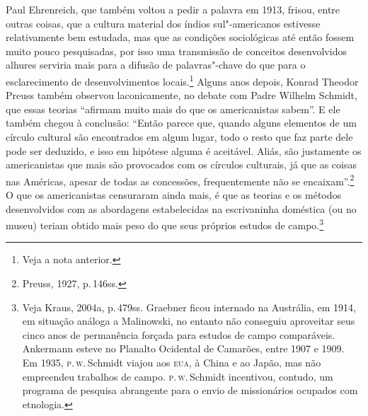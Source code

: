 Paul Ehrenreich, que também voltou a pedir a palavra em 1913, frisou,
entre outras coisas, que a cultura material dos índios sul"-americanos
estivesse relativamente bem estudada, mas que as condições sociológicas
até então fossem muito pouco pesquisadas, por isso uma transmissão de
conceitos desenvolvidos alhures serviria mais para a difusão de
palavras"-chave do que para o esclarecimento de desenvolvimentos
locais.\footnote{Veja a nota anterior.} Alguns anos depois, Konrad
Theodor Preuss também observou laconicamente, no debate com Padre
Wilhelm Schmidt, que essas teorias ``afirmam muito mais do que os
americanistas sabem''. E ele também chegou à conclusão: ``Então parece
que, quando alguns elementos de um círculo cultural são encontrados em
algum lugar, todo o resto que faz parte dele pode ser deduzido, e isso
em hipótese alguma é aceitável. Aliás, são justamente os americanistas
que mais são provocados com os círculos culturais, já que as coisas nas
Américas, apesar de todas as concessões, frequentemente não se
encaixam''.\footnote{Preuss, 1927, p.\,146ss.} O que os americanistas censuraram
ainda mais, é que as teorias e os métodos desenvolvidos com as
abordagens estabelecidas na escrivaninha doméstica (ou no museu) teriam
obtido mais peso do que seus próprios estudos de campo.\footnote{Veja
  Kraus, 2004a, p.\,479ss. Graebner ficou internado na Austrália, em
  1914, em situação análoga a Malinowski, no entanto não conseguiu
  aproveitar seus cinco anos de permanência forçada para estudos de
  campo comparáveis. Ankermann esteve no Planalto Ocidental de Camarões,
  entre 1907 e 1909. Em 1935, \textsc{p}.\,\textsc{w}.\,Schmidt viajou aos \textsc{eua}, à China e ao
  Japão, mas não empreendeu trabalhos de campo. \textsc{p}.\,\textsc{w}.\,Schmidt
  incentivou, contudo, um programa de pesquisa abrangente para o envio
  de missionários ocupados com etnologia.}

